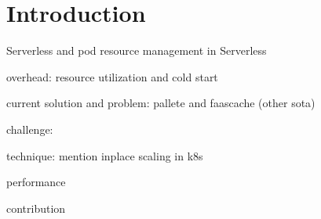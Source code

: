 \section{Introduction}
\label{sec:introduction}



Serverless and pod resource management in Serverless

overhead: resource utilization and cold start

current solution and problem: pallete and faascache (other sota)

challenge: 

technique: mention inplace scaling in k8s

performance

contribution
